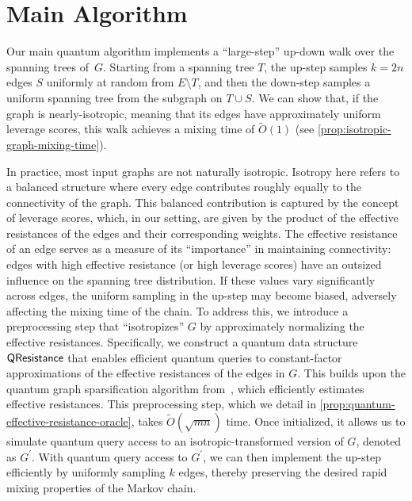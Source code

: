 \documentclass[11pt]{article}
\begin{document}
{\section{Main Algorithm}

Our main quantum algorithm implements a ``large-step'' up-down walk over the spanning trees of~$G$.
Starting from a spanning tree $T$, the up-step samples $k = 2n$ edges $S$ uniformly at random from $E \setminus T$, and then the down-step samples a uniform spanning tree from the subgraph on $T \cup S$.
We can show that, if the graph is  nearly-isotropic,
meaning that its edges have approximately uniform leverage scores,
this walk achieves a mixing time of $\widetilde O(1)$ (see \cref{prop:isotropic-graph-mixing-time}).

In practice, most input graphs are not naturally isotropic. Isotropy here refers to a balanced structure where every edge contributes roughly equally to the connectivity of the graph. This balanced contribution is captured by the concept of leverage scores, which, in our setting, are given by the product of the effective resistances of the edges and their corresponding weights. The effective resistance of an edge serves as a measure of its “importance” in maintaining connectivity: edges with high effective resistance (or high leverage scores) have an outsized influence on the spanning tree distribution. If these values vary significantly across edges, the uniform sampling in the up-step may become biased, adversely affecting the mixing time of the chain.
To address this, we introduce a preprocessing step that ``isotropizes'' $G$ by approximately normalizing the effective resistances. 
Specifically, we construct a quantum data structure $\mathsf{QResistance}$ that enables efficient quantum queries to constant-factor approximations of the effective resistances of the edges in $G$. This builds upon the quantum graph sparsification algorithm from~\cite{AdW22}, which efficiently estimates effective resistances.
This preprocessing step, which we detail in \cref{prop:quantum-effective-resistance-oracle}, takes $\widetilde{O}(\sqrt{mn})$ time. Once initialized, it allows us to simulate quantum query access to an isotropic-transformed version of $G$, denoted as $G^{\prime}$. 
With quantum query access to $G^{\prime}$, we can then implement the up-step efficiently by uniformly sampling $k$ edges, thereby preserving the desired rapid mixing properties of the Markov chain.



}
\end{document}
